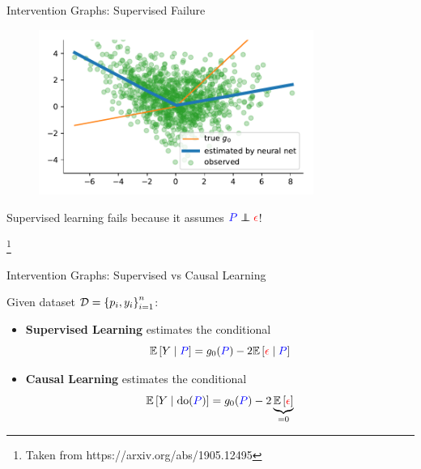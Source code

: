 \documentclass[xcolor={dvipsnames}]{beamer}
\newcommand{\source}[1]{{\let\thefootnote\relax\footnote{{\tiny #1}}}}
\newcommand{\policy}{\mbox{\textcolor{blue}{$P$}}}
\newcommand{\response}{\mbox{\textcolor{black}{$Y$}}}
\newcommand{\confounder}{\mbox{\textcolor{red}{$\epsilon$}}}
\newcommand{\ind}{\perp\!\!\!\!\perp}
\begin{document}
    \begin{frame}{Intervention Graphs: Supervised Failure}

        \begin{figure}
            \centering
            \includegraphics[width=0.8\textwidth]{figures/toy}
        \end{figure}

        \begin{center}
            \large Supervised learning fails because it assumes \( \policy{} \ind \confounder{} \)!
        \end{center}

        \source{Taken from https://arxiv.org/abs/1905.12495}

    \end{frame}

    \begin{frame}{Intervention Graphs: Supervised vs Causal Learning }

        \begin{figure}
            \centering
            
        \end{figure}

        Given dataset \( \mathcal{D} = \left\{p_i, y_i\right\}_{i=1}^n \):
        \begin{itemize}
            \item \textbf{Supervised Learning} estimates the conditional
            \[ \E \sbr{\response{} \mid \policy{}} = g_0(\policy{}) - 2 \E \sbr{\confounder{} \mid \policy{}} \]
            \item \textbf{Causal Learning} estimates the conditional
            \[ \E \sbr{\response{} \mid \text{do}{(\policy{})}} = g_0(\policy{}) -2 \underbrace{\E\sbr{\confounder{}}}_{=0}\]
        \end{itemize}
    \end{frame}
\end{document}
